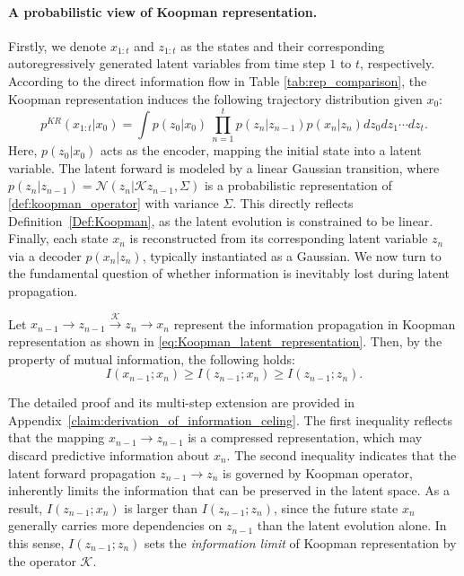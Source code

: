 \documentclass{article} %
\newcommand{\zs}[1]{\textcolor{blue}{[ZS: #1]}}
\begin{document}
\paragraph{A probabilistic view of Koopman representation.} Firstly, we denote $x_{1:t}$ and $z_{1:t}$ as the states and their corresponding autoregressively 
generated latent variables from time step $1$ to $t$, respectively. According to the direct information flow in Table \ref{tab:rep_comparison}, the Koopman representation induces the following trajectory distribution given $x_0$: 
\begin{equation}
    p^{KR}(x_{1:t} | x_0) = \int p(z_0 | x_0) \ \prod_{n = 1}^{t} p(z_{n} | z_{n-1}) p(x_n | z_n) dz_0dz_1 \cdots dz_t. \label{eq:Koopman_latent_representation}
\end{equation}
Here, $p(z_0| x_0)$ acts as the encoder, mapping the initial state into a latent variable. The latent forward is modeled by a linear Gaussian transition, where $p(z_{n} | z_{n-1}) = \mathcal{N}(z_{n} | \mathcal{K} z_{n-1}, \Sigma)$ is a probabilistic representation of \eqref{def:koopman_operator} with variance $\Sigma$. This directly reflects Definition~\ref{Def:Koopman}, as the latent evolution is constrained to be linear. Finally, each state $x_n$ is reconstructed from its corresponding latent variable $z_n$ via a decoder $p(x_n | z_n)$, typically instantiated as a Gaussian. We now turn to the fundamental question of whether information is inevitably lost during latent propagation.

\begin{claimwithframe} \label{claim:info_loss}
Let $x_{n-1} \to z_{n-1} \xrightarrow{\mathcal{K}} z_n \!\to\! x_{n}$ represent the information propagation in Koopman representation as shown in \eqref{eq:Koopman_latent_representation}. Then, by the property of mutual information, the following holds:
\begin{equation}
    I(x_{n-1}; x_{n}) \geq I(z_{n-1}; x_{n}) \geq I(z_{n-1}; z_{n}) . \label{info_propagation}
\end{equation}
\end{claimwithframe}
The detailed proof and its multi-step extension are provided in Appendix~\ref{claim:derivation_of_information_celing}. The first inequality reflects that the mapping $x_{n-1} \to z_{n-1}$ is a compressed representation, which may discard predictive information about $x_{n}$. The second inequality indicates that the latent forward propagation $z_{n-1} \to z_{n}$ is governed by Koopman operator, inherently limits the information that can be preserved in the latent space. As a result, $I(z_{n-1}; x_{n})$ is larger than $I(z_{n-1}; z_{n})$, since the future state $x_{n}$ generally carries more dependencies on $z_{n-1}$ than the latent evolution alone. In this sense, $I(z_{n-1}; z_{n})$ sets the \textit{information limit} of Koopman representation by the operator $\mathcal{K}$.  
\end{document}
